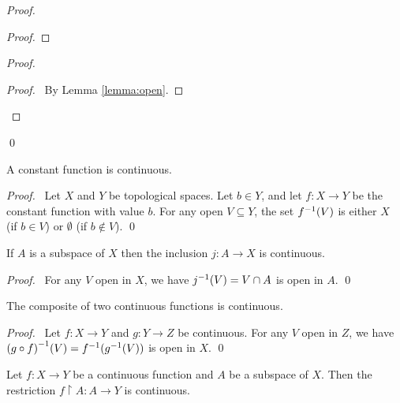 \begin{proof}
\begin{proof}
    \end{proof}
    \begin{proof}
        \qedstep
        \begin{proof}
            \pf\ By Lemma \ref{lemma:open}.
        \end{proof}
    \end{proof}
    \qed
\end{proof}

\begin{theorem}
    A constant function is continuous.
\end{theorem}

\begin{proof}
    \pf\ Let $X$ and $Y$ be topological spaces. Let $b \in Y$, and let $f : X \rightarrow Y$ be the constant
    function with value $b$. For any open $V \subseteq Y$, the set ${f}^{-1}(V)$ is either $X$ (if $b \in V$)
    or $\emptyset$ (if $b \notin V$). \qed
\end{proof}

\begin{theorem}
    If $A$ is a subspace of $X$ then the inclusion $j : A \rightarrow X$ is continuous.
\end{theorem}

\begin{proof}
    \pf\ For any $V$ open in $X$, we have ${j}^{-1}(V) = V \cap A$ is open in $A$. \qed
\end{proof}

\begin{theorem}
    \label{theorem:composite_continuous}
    The composite of two continuous functions is continuous.
\end{theorem}

\begin{proof}
    \pf\ Let $f : X \rightarrow Y$ and $g : Y \rightarrow Z$ be continuous. For any $V$ open in $Z$,
    we have ${(g \circ f)}^{-1}(V) = {f}^{-1}({g}^{-1}(V))$ is open in $X$. \qed
\end{proof}

\begin{theorem}
    Let $f : X \rightarrow Y$ be a continuous function and $A$ be a subspace of $X$. Then the restriction
    $f \restriction A : A \rightarrow Y$ is continuous.
\end{theorem}

